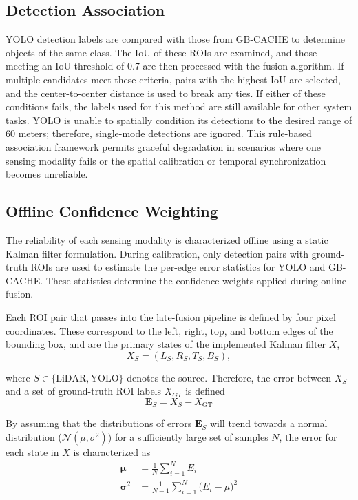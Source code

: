\documentclass{erauthesis}
\begin{document}
\subsection{Detection Association}

YOLO detection labels are compared with those from GB-CACHE to determine objects of the same class. 
The \ac{IoU} of these \ac{ROI}s are examined, and those meeting an \ac{IoU}  threshold of 0.7 are then processed with the fusion algorithm. 
If multiple candidates meet these criteria, pairs with the highest IoU are selected, and the center-to-center distance is used to break any ties.
If either of these conditions fails, the labels used for this method are still available for other system tasks.
YOLO is unable to spatially condition its detections to the desired range of 60 meters; therefore, single-mode detections are ignored.
This rule-based association framework permits graceful degradation in scenarios where one sensing modality fails or the spatial calibration or temporal synchronization becomes unreliable.

\subsection{Offline Confidence Weighting}

The reliability of each sensing modality is characterized offline using a static Kalman filter formulation. 
During calibration, only detection pairs with ground-truth ROIs are used to estimate the per-edge error statistics for YOLO and GB-CACHE. 
These statistics determine the confidence weights applied during online fusion.

Each ROI pair that passes into the late-fusion pipeline is defined by four pixel coordinates.
These  correspond to the left, right, top, and bottom edges of the bounding box, and are the primary states of the implemented Kalman filter $X$,
\begin{equation}
X_{S} = (L_{S}, R_{S}, T_{S}, B_{S}),
\end{equation}

where $S \in \{\text{LiDAR}, \text{YOLO}\}$ denotes the source. 
Therefore, the error between $X_{S}$ and a set of ground-truth ROI labels $X_{GT}$ is defined
\begin{equation}
\mathbf{E}_{S} = X_{S} - X_{\text{GT}}
\end{equation}

By assuming that the distributions of errors $\mathbf{E}_S$ will trend towards a normal distribution  ($\mathcal{N}(\mu , \sigma^2)$) for a sufficiently large set of samples $N$, the error for each state in $X$ is characterized as  
\begin{align}
\mathbf{\mu} &= \frac{1}{N} \sum_{i=1}^{N} E_{i}\\
\mathbf{\sigma}^2 &= \frac{1}{N - 1} \sum_{i=1}^{N}
\bigl(E_{i} - \mu\bigr)^2
\end{align}
\end{document}
